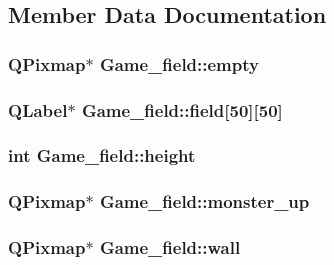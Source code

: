 \subsection{Member Data Documentation}
\hypertarget{classGame__field_ae9235aa8798fdb0db4385064b5c40b21}{
\subsubsection[{empty}]{\setlength{\rightskip}{0pt plus 5cm}Q\-Pixmap$\ast$ Game\-\_\-field\-::empty}}\label{classGame__field_ae9235aa8798fdb0db4385064b5c40b21}
\hypertarget{classGame__field_a144d007ae7c2224829dd34d67dd96e98}{
\subsubsection[{field}]{\setlength{\rightskip}{0pt plus 5cm}Q\-Label$\ast$ Game\-\_\-field\-::field\mbox{[}50\mbox{]}\mbox{[}50\mbox{]}}}\label{classGame__field_a144d007ae7c2224829dd34d67dd96e98}
\hypertarget{classGame__field_a21f6f197950dc49b669faa6d90208912}{
\subsubsection[{height}]{\setlength{\rightskip}{0pt plus 5cm}int Game\-\_\-field\-::height}}\label{classGame__field_a21f6f197950dc49b669faa6d90208912}
\hypertarget{classGame__field_aef92a0fbf4509d6b6bfa9f8833acdbb9}{
\subsubsection[{monster\-\_\-up}]{\setlength{\rightskip}{0pt plus 5cm}Q\-Pixmap$\ast$ Game\-\_\-field\-::monster\-\_\-up}}\label{classGame__field_aef92a0fbf4509d6b6bfa9f8833acdbb9}
\hypertarget{classGame__field_a7366baff6372c613d42616d7e0286fa0}{
\subsubsection[{wall}]{\setlength{\rightskip}{0pt plus 5cm}Q\-Pixmap$\ast$ Game\-\_\-field\-::wall}}\label{classGame__field_a7366baff6372c613d42616d7e0286fa0}

